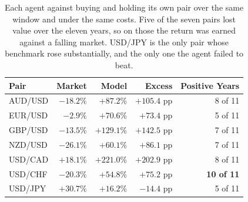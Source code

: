 \begin{table}[htb!]
\centering
\footnotesize
\begin{tabular}{@{}lrrrr@{}}
\toprule
\textbf{Pair} & \textbf{Market} & \textbf{Model} & \textbf{Excess} & \textbf{Positive Years} \\
\midrule
AUD/USD & $-18.2\%$ & $+87.2\%$ & $+105.4$ pp & 8 of 11 \\
EUR/USD & $-2.9\%$ & $+70.6\%$ & $+73.4$ pp & 5 of 11 \\
GBP/USD & $-13.5\%$ & $+129.1\%$ & $+142.5$ pp & 7 of 11 \\
NZD/USD & $-26.1\%$ & $+60.1\%$ & $+86.1$ pp & 7 of 11 \\
USD/CAD & $+18.1\%$ & $+221.0\%$ & $+202.9$ pp & 8 of 11 \\
USD/CHF & $-20.3\%$ & $+54.8\%$ & $+75.2$ pp & \textbf{10 of 11} \\
USD/JPY & $+30.7\%$ & $+16.2\%$ & $\mathbf{-14.4}$ pp & 5 of 11 \\
\bottomrule
\end{tabular}
\caption{Each agent against buying and holding its own pair over the same window and under the same costs. Five of the seven pairs lost value over the eleven years, so on those the return was earned against a falling market. USD/JPY is the only pair whose benchmark rose substantially, and the only one the agent failed to beat.}
\label{Tables:Benchmark}
\end{table}